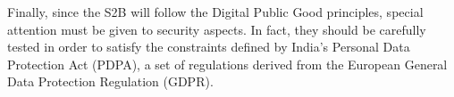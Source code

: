 Finally, since the S2B will follow the Digital Public Good principles, special attention must be given to security aspects. In fact, they should be carefully tested in order to satisfy the constraints defined by India’s Personal Data Protection Act (PDPA), a set of regulations derived from the European General Data Protection Regulation (GDPR).
